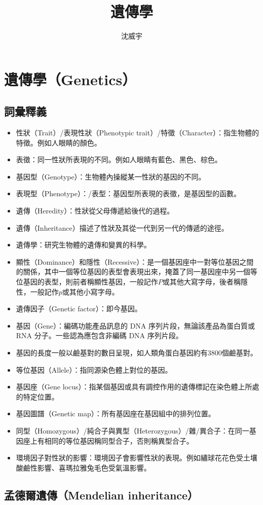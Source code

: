 \documentclass[a4paper,12pt]{report}
\begin{document}
\title{遺傳學}
\author{沈威宇}
\date{\temtoday}
\titletocdoc
\chapter{遺傳學（Genetics）}
\section{詞彙釋義}
\begin{itemize}
\item 性狀（Trait）/表現性狀（Phenotypic trait）/特徵（Character）：指生物體的特徵。例如人眼睛的顏色。
\item 表徵：同一性狀所表現的不同。例如人眼睛有藍色、黑色、棕色。
\item 基因型（Genotype）：生物體內操縱某一性狀的基因的不同。
\item 表現型（Phenotype）：/表型：基因型所表現的表徵，是基因型的函數。
\item 遺傳（Heredity）：性狀從父母傳遞給後代的過程。 
\item 遺傳（Inheritance）描述了性狀及其從一代到另一代的傳遞的途徑。
\item 遺傳學：研究生物體的遺傳和變異的科學。
\item 顯性（Dominance）和隱性（Recessive）：是一個基因座中一對等位基因之間的關係，其中一個等位基因的表型會表現出來，掩蓋了同一基因座中另一個等位基因的表型，則前者稱顯性基因，一般記作$P$或其他大寫字母，後者稱隱性，一般記作$p$或其他小寫字母。
\item 遺傳因子（Genetic factor）：即今基因。
\item 基因（Gene）：編碼功能產品訊息的 DNA 序列片段，無論該產品為蛋白質或 RNA 分子。一些認為應包含非編碼 DNA 序列片段。
\item 基因的長度一般以鹼基對的數目呈現，如人類角蛋白基因約有3800個鹼基對。
\item 等位基因（Allele）：指同源染色體上對位的基因。
\item 基因座（Gene locus）：指某個基因或具有調控作用的遺傳標記在染色體上所處的特定位置。
\item 基因圖譜（Genetic map）：所有基因座在基因組中的排列位置。
\item 同型（Homozygous）/純合子與異型（Heterozygous）/雜/異合子：在同一基因座上有相同的等位基因稱同型合子，否則稱異型合子。
\item 環境因子對性狀的影響：環境因子會影響性狀的表現。例如繡球花花色受土壤酸鹼性影響、喜瑪拉雅兔毛色受氣溫影響。
\end{itemize}
\section{孟德爾遺傳（Mendelian inheritance）}
\end{document}

